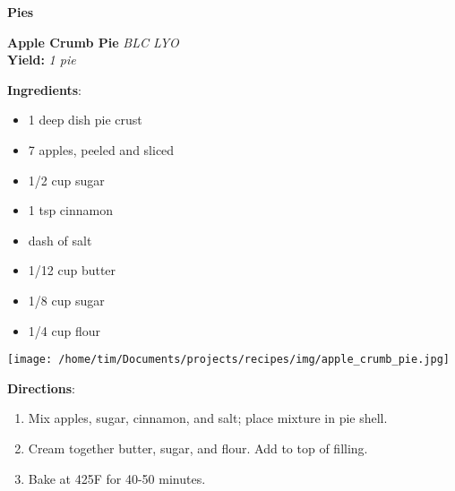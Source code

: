 \documentclass[11pt, twoside, openany]{book}
\begin{document}
{\newpage \LARGE \textbf{Pies}} \label{pies}\\
\noindent\begin{minipage}[t]{\linewidth}%
{\Large\textbf{Apple Crumb Pie}} \label{apple-crumb-pie}\hfill\textit{BLC LYO}\\
\textbf{Yield:} \textit{1 pie}\\
\noindent\begin{minipage}[t]{0.78\linewidth}%
\textbf{Ingredients}:\vspace{-3mm}
\begin{multicols}{2}
\begin{itemize}\setlength\itemsep{-1mm}
\item 1 deep dish pie crust
\item 7 apples, peeled and sliced
\item 1/2 cup sugar
\item 1 tsp cinnamon
\item dash of salt
\item 1/12 cup butter
\item 1/8 cup sugar
\item 1/4 cup flour
\end{itemize}
\end{multicols}
\end{minipage}
\noindent\begin{minipage}[t]{0.18\linewidth}
\centering \strut\vspace*{-\baselineskip}\newline
\texttt{[image: /home/tim/Documents/projects/recipes/img/apple\_crumb\_pie.jpg]}\\
\end{minipage}\vspace{3mm}
\textbf{Directions}:
\vspace{-3mm}\begin{enumerate}\setlength\itemsep{-1mm}
\item Mix apples, sugar, cinnamon, and salt; place mixture in pie shell.
\item Cream together butter, sugar, and flour. Add to top of filling.
\item Bake at 425F for 40-50 minutes.
\end{enumerate}
\end{minipage}\vspace{8mm}
\end{document}
